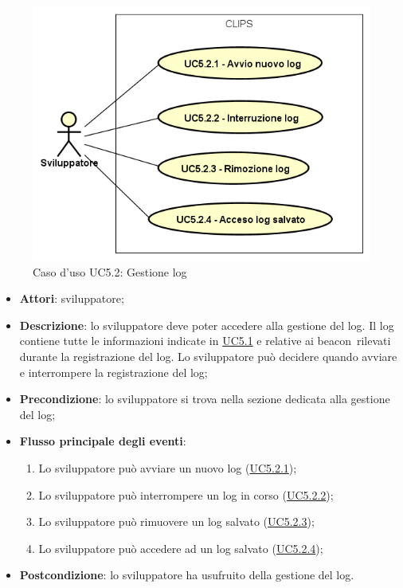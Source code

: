 \documentclass[../AnalisiDeiRequisiti.tex]{subfiles}
\begin{document}
        \begin{figure}[!h]
            \centering
            \includegraphics[scale=0.95, width=\textwidth]{img/UC5-2.png}
            \caption{Caso d'uso UC5.2: Gestione log}\label{fig:UC5.2} 
        \end{figure}
\begin{itemize}
\item \textbf{Attori}: sviluppatore;
\item \textbf{Descrizione}: lo sviluppatore deve poter accedere alla gestione del log. Il log contiene tutte le informazioni indicate in \hyperlink{UC5.1}{UC5.1} e relative ai beacon\g\ rilevati durante la registrazione del log. Lo sviluppatore può decidere quando avviare e interrompere la registrazione del log; 
      \item \textbf{Precondizione}: lo sviluppatore si trova nella sezione dedicata alla gestione del log;

        \item \textbf{Flusso principale degli eventi}:
          \begin{enumerate}
          \item Lo sviluppatore può avviare un nuovo log (\hyperlink{UC5.2.1}{UC5.2.1});
          \item Lo sviluppatore può interrompere un log in corso (\hyperlink{UC5.2.2}{UC5.2.2});
          \item Lo sviluppatore può rimuovere un log salvato (\hyperlink{UC5.2.3}{UC5.2.3});
          \item Lo sviluppatore può accedere ad un log salvato (\hyperlink{UC5.2.4}{UC5.2.4});

      \end{enumerate}
    \item \textbf{Postcondizione}: lo sviluppatore ha usufruito della gestione del log.
  \end{itemize}
\hypertarget{UC5.2.1}{}
\end{document}
